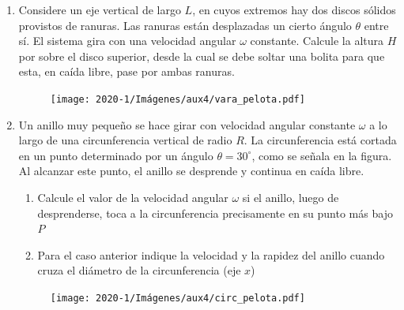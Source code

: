 \documentclass[letterpaper,11pt]{article}
\begin{document}
\begin{enumerate}\setlength{\itemsep}{0.4cm}

\item Considere un eje vertical de largo $L$, en cuyos extremos hay dos discos sólidos provistos de ranuras. Las ranuras están desplazadas un cierto ángulo $\theta$ entre sí. El sistema gira con una velocidad angular $\omega$ constante. Calcule la altura $H$ por sobre el disco superior, desde la cual se debe soltar una bolita para que esta, en caída libre, pase por ambas ranuras.

\begin{figure}[H]
    \centering
    \texttt{[image: 2020-1/Imágenes/aux4/vara\_pelota.pdf]}
\end{figure}

\item Un anillo muy pequeño se hace girar con velocidad angular constante $\omega$ a lo largo de una circunferencia vertical de radio $R$. La circunferencia está cortada en un punto determinado por un ángulo $\theta = 30^{\circ}$, como se señala en la figura. Al alcanzar este punto, el anillo se desprende y continua en caída libre.
    \begin{enumerate}
        \item Calcule el valor de la velocidad angular $\omega$ si el anillo, luego de desprenderse, toca a la circunferencia precisamente en su punto más bajo $P$
    
        \item Para el caso anterior indique la velocidad y la rapidez del anillo cuando cruza el diámetro de la circunferencia (eje $x$)
    \end{enumerate}
\begin{figure}[H]
    \centering
    \texttt{[image: 2020-1/Imágenes/aux4/circ\_pelota.pdf]}
\end{figure}

\end{enumerate}
\end{document}
